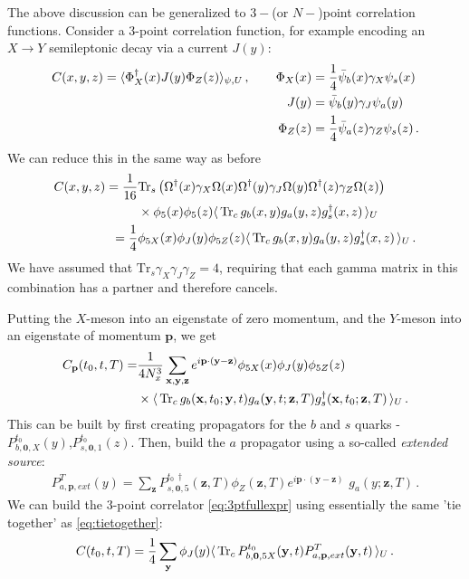 The above discussion can be generalized to $3-$(or $N-$)point correlation functions. Consider a 3-point correlation function, for example encoding an $X\to Y$ semileptonic decay via a current $J(y)$:
\begin{align}
  C(x,y,z) = \langle \Phi^{\dagger}_X(x) J(y) \Phi_Z(z) \rangle_{\psi,U} \,,\quad \quad \Phi_X(x) &= {1\over 4} \bar{\psi}_b(x) \gamma_X \psi_s(x) \\
  \nonumber
  J(y) &= \bar{\psi}_b(y)\gamma_J\psi_a(y) \\
  \nonumber
  \Phi_Z(z) &= {1\over 4}\bar{\psi}_a(z)\gamma_Z \psi_s(z)\,.
\end{align}
We can reduce this in the same way as before
\begin{align}
  C(x,y,z) = {1\over 16}& \text{Tr}_s\left( \Omega^{\dagger}(x) \gamma_X \Omega(x) \Omega^{\dagger}(y) \gamma_J \Omega(y) \Omega^{\dagger}(z) \gamma_Z \Omega(z) \right) \\ \nonumber &\times \phi_5(x)\phi_5(z)\langle \,\text{Tr}_c\, g_{b}(x,y) g_{a}(y,z) g^{\dagger}_{s}(x,z)\,\rangle_U \\
  = {1\over 4}& \phi_{5X}(x) \phi_J(y) \phi_{5Z}(z) \langle \,\text{Tr}_c\, g_{b}(x,y) g_{a}(y,z) g^{\dagger}_{s}(x,z) \,\rangle_U\,.
\end{align}
We have assumed that $\text{Tr}_s \gamma_X\gamma_J\gamma_Z = 4$, requiring that each gamma matrix in this combination has a partner and therefore cancels.

Putting the $X$-meson into an eigenstate of zero momentum, and the $Y$-meson into an eigenstate of momentum ${\textbf{p}}$, we get
\begin{align}
  \nonumber
  C_{\textbf{p}}(t_0,t,T) =& {1\over 4 N_x^3} \sum_{{\textbf{x}},{\textbf{y}},{\textbf{z}}} e^{i{\textbf{p}}\cdot({\textbf{y}}-{\textbf{z}})} \phi_{5X}(x) \phi_J(y) \phi_{5Z}(z) \\ &\times\langle\, \text{Tr}_c\, g_{b}({\textbf{x}},t_0;{\textbf{y}},t) g_{a}({\textbf{y}},t;{\textbf{z}},T) g^{\dagger}_{s}({\textbf{x}},t_0;{\textbf{z}},T) \,\rangle_U\,.
  \label{eq:3ptfullexpr}
\end{align}
This can be built by first creating propagators for the $b$ and $s$ quarks - $P^{t_0}_{b,{\textbf{0}},X}(y)$,$P^{t_0}_{s,{\textbf{0}},1}(z)$. Then, build the $a$ propagator using a so-called {\textit{extended source}}:
\begin{align}
  P^T_{a,{\textbf{p}},ext}(y) = \sum_{{\textbf{z}}} P^{t_0\,\dagger}_{s,{\textbf{0}},5}({\textbf{z}},T) \phi_{Z}({\textbf{z}},T) e^{i{\textbf{p}}\cdot({\textbf{y}}-{\textbf{z}})}\,\,g_{a}(y;{\textbf{z}},T)\,.
\end{align}
We can build the 3-point correlator \eqref{eq:3ptfullexpr} using essentially the same 'tie together' as \eqref{eq:tietogether}:
\begin{align}
  C(t_0,t,T) = {1\over 4}\sum_{\textbf{y}} \phi_J(y) \langle\,\text{Tr}_c\, P^{t_0}_{b,{\textbf{0}},5X}({\textbf{y}},t) P^T_{a,{\textbf{p}},ext}({\textbf{y}},t) \,\rangle_U\,.
\end{align}

